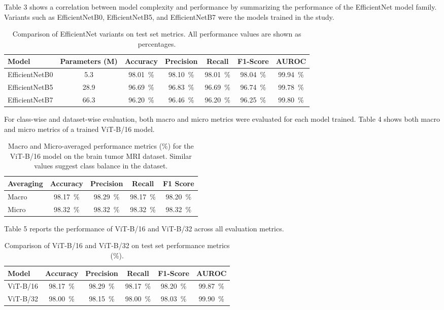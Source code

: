 \documentclass[11pt]{article}
\begin{document}
Table 3 shows a correlation between model complexity and performance by summarizing the performance of the EfficientNet model family. Variants such as EfficientNetB0, EfficientNetB5, and EfficientNetB7 were the models trained in the study.

\begin{table}[H]
\centering
\caption{Comparison of EfficientNet variants on test set metrics. All performance values are shown as percentages.}
\begin{tabular}{lcccccc}
\toprule
\textbf{Model} & \textbf{Parameters (M)} & \textbf{Accuracy} & \textbf{Precision} & \textbf{Recall} & \textbf{F1-Score} & \textbf{AUROC} \\
\midrule
EfficientNetB0 & 5.3  & 98.01~\% & 98.10~\% & 98.01~\% & 98.04~\% & 99.94~\% \\
EfficientNetB5 & 28.9 & 96.69~\% & 96.83~\% & 96.69~\% & 96.74~\% & 99.78~\% \\
EfficientNetB7 & 66.3 & 96.20~\% & 96.46~\% & 96.20~\% & 96.25~\% & 99.80~\% \\
\bottomrule
\end{tabular}
\label{tab:efficientnet_variants}
\end{table}


For class-wise and dataset-wise evaluation, both macro and micro metrics were evaluated for each model trained. Table 4 shows both macro and micro metrics of a trained ViT-B/16 model.

\begin{table}[H]
\centering
\caption{Macro and Micro-averaged performance metrics (\%) for the ViT-B/16 model on the brain tumor MRI dataset. Similar values suggest class balance in the dataset.}
\begin{tabular}{lcccc}
\toprule
\textbf{Averaging} & \textbf{Accuracy} & \textbf{Precision} & \textbf{Recall} & \textbf{F1 Score} \\
\midrule
Macro & 98.17~\% & 98.29~\% & 98.17~\% & 98.20~\% \\
Micro & 98.32~\% & 98.32~\% & 98.32~\% & 98.32~\% \\
\bottomrule
\end{tabular}
\label{tab:macro_micro_metrics}
\end{table}

Table 5 reports the performance of ViT-B/16 and ViT-B/32 across all evaluation metrics.

\begin{table}[H]
\centering
\caption{Comparison of ViT-B/16 and ViT-B/32 on test set performance metrics (\%).}
\begin{tabular}{lccccc}
\toprule
\textbf{Model} & \textbf{Accuracy} & \textbf{Precision} & \textbf{Recall} & \textbf{F1-Score} & \textbf{AUROC} \\
\midrule
ViT-B/16 & 98.17~\% & 98.29~\% & 98.17~\% & 98.20~\% & 99.87~\% \\
ViT-B/32 & 98.00~\% & 98.15~\% & 98.00~\% & 98.03~\% & 99.90~\% \\
\bottomrule
\end{tabular}
\label{tab:vit_b16_b32_comparison}
\end{table}
\end{document}
